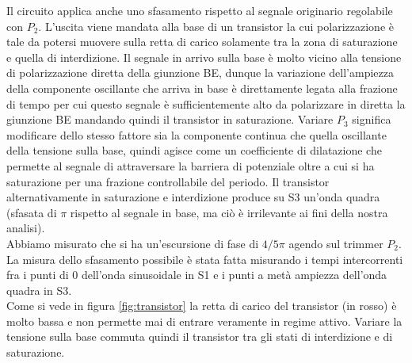 \documentclass[10pt,a4paper]{article}
\begin{document}

Il circuito applica anche uno sfasamento rispetto al segnale originario regolabile con $P_2$. L'uscita viene mandata alla base di un transistor la cui polarizzazione è tale da potersi muovere sulla retta di carico solamente  tra la zona di saturazione e quella di interdizione. Il segnale in arrivo sulla base è molto vicino alla tensione di polarizzazione diretta della giunzione BE, dunque la variazione dell'ampiezza della componente oscillante che arriva in base è direttamente legata alla frazione di tempo per cui questo segnale è sufficientemente alto da polarizzare in diretta la giunzione BE mandando quindi il transistor in saturazione. Variare $P_3$ significa modificare dello stesso fattore sia la componente continua che quella oscillante della tensione sulla base, quindi agisce come un coefficiente di dilatazione che permette al segnale di attraversare la barriera di potenziale oltre a cui si ha saturazione per una frazione controllabile del periodo.
Il transistor alternativamente in saturazione e interdizione produce su S3 un'onda quadra (sfasata di $\pi$ rispetto al segnale in base, ma ciò è irrilevante ai fini della nostra analisi).\\
 Abbiamo misurato che si ha un'escursione di fase di $4/5 \pi$ agendo sul trimmer $P_2$. La misura dello sfasamento possibile è stata fatta misurando i tempi intercorrenti fra i punti di 0 dell'onda sinusoidale in S1 e i punti a metà ampiezza  dell'onda quadra in S3.\\



Come si vede in figura \ref{fig:transistor} la retta di carico del transistor (in rosso) è molto bassa e non permette mai di entrare veramente in regime attivo. Variare la tensione sulla base commuta quindi il transistor tra gli stati di interdizione e di saturazione.\\

\end{document}
